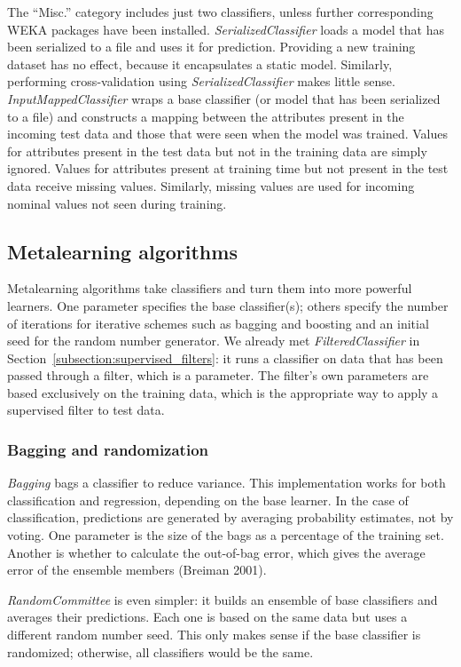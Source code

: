 The ``Misc.'' category includes just two classifiers, unless further
corresponding WEKA packages have been
installed. \textit{SerializedClassifier} loads a model that has been
serialized to a file and uses it for prediction. Providing a new
training dataset has no effect, because it encapsulates a static
model. Similarly, performing cross-validation using
\textit{SerializedClassifier} makes little
sense. \textit{InputMappedClassifier} wraps a base classifier (or
model that has been serialized to a file) and constructs a mapping
between the attributes present in the incoming test data and those
that were seen when the model was trained. Values for attributes
present in the test data but not in the training data are simply
ignored. Values for attributes present at training time but not
present in the test data receive missing values. Similarly, missing
values are used for incoming nominal values not seen during training.

\subsection{Metalearning algorithms}

Metalearning algorithms take classifiers and turn them into more
powerful learners. One parameter specifies the base classifier(s); others
specify the number of iterations for iterative schemes such as bagging
and boosting and an initial seed for the random number generator. We
already met \textit{FilteredClassifier} in
Section~\ref{subsection:supervised_filters}: it runs a classifier on
data that has been passed through a filter, which is a parameter. The
filter's own parameters are based exclusively on the training data,
which is the appropriate way to apply a supervised filter to test
data.

\subsubsection{Bagging and randomization}

\textit{Bagging} bags a classifier to reduce variance. This
implementation works for both classification and regression, depending
on the base learner. In the case of classification, predictions are
generated by averaging probability estimates, not by voting. One
parameter is the size of the bags as a percentage of the training
set. Another is whether to calculate the out-of-bag error, which gives
the average error of the ensemble members (Breiman 2001).

\textit{RandomCommittee} is even simpler: it builds an ensemble of
base classifiers and averages their predictions. Each one is based on
the same data but uses a different random number seed. This only makes
sense if the base classifier is randomized; otherwise, all classifiers
would be the same.

